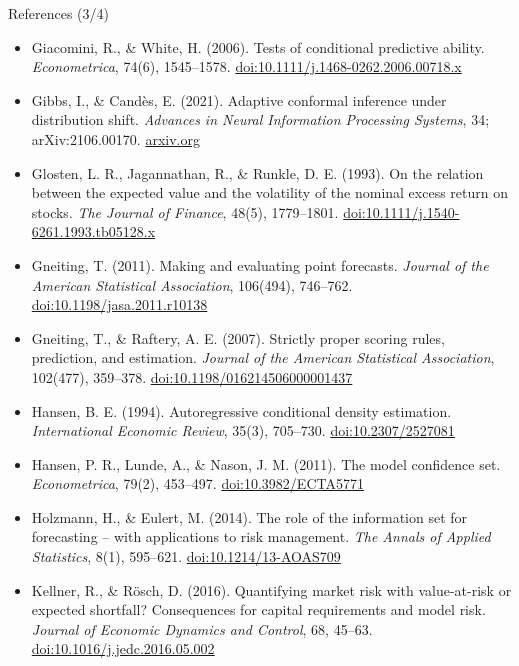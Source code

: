 \begin{frame}{References (3/4)}
\itemsize{\tiny}
\begin{itemize}
    \item Giacomini, R., \& White, H. (2006). Tests of conditional predictive ability. \textit{Econometrica}, 74(6), 1545--1578. \href{https://doi.org/10.1111/j.1468-0262.2006.00718.x}{doi:10.1111/j.1468-0262.2006.00718.x}
    \item Gibbs, I., \& Candès, E. (2021). Adaptive conformal inference under distribution shift. \textit{Advances in Neural Information Processing Systems}, 34; arXiv:2106.00170. \href{https://arxiv.org/abs/2106.00170}{arxiv.org}
    \item Glosten, L. R., Jagannathan, R., \& Runkle, D. E. (1993). On the relation between the expected value and the volatility of the nominal excess return on stocks. \textit{The Journal of Finance}, 48(5), 1779--1801. \href{https://doi.org/10.1111/j.1540-6261.1993.tb05128.x}{doi:10.1111/j.1540-6261.1993.tb05128.x}
    \item Gneiting, T. (2011). Making and evaluating point forecasts. \textit{Journal of the American Statistical Association}, 106(494), 746--762. \href{https://doi.org/10.1198/jasa.2011.r10138}{doi:10.1198/jasa.2011.r10138}
    \item Gneiting, T., \& Raftery, A. E. (2007). Strictly proper scoring rules, prediction, and estimation. \textit{Journal of the American Statistical Association}, 102(477), 359--378. \href{https://doi.org/10.1198/016214506000001437}{doi:10.1198/016214506000001437}
    \item Hansen, B. E. (1994). Autoregressive conditional density estimation. \textit{International Economic Review}, 35(3), 705--730. \href{https://doi.org/10.2307/2527081}{doi:10.2307/2527081}
    \item Hansen, P. R., Lunde, A., \& Nason, J. M. (2011). The model confidence set. \textit{Econometrica}, 79(2), 453--497. \href{https://doi.org/10.3982/ECTA5771}{doi:10.3982/ECTA5771}
    \item Holzmann, H., \& Eulert, M. (2014). The role of the information set for forecasting -- with applications to risk management. \textit{The Annals of Applied Statistics}, 8(1), 595--621. \href{https://doi.org/10.1214/13-AOAS709}{doi:10.1214/13-AOAS709}
    \item Kellner, R., \& Rösch, D. (2016). Quantifying market risk with value-at-risk or expected shortfall? Consequences for capital requirements and model risk. \textit{Journal of Economic Dynamics and Control}, 68, 45--63. \href{https://doi.org/10.1016/j.jedc.2016.05.002}{doi:10.1016/j.jedc.2016.05.002}

\end{itemize}
\end{frame}
